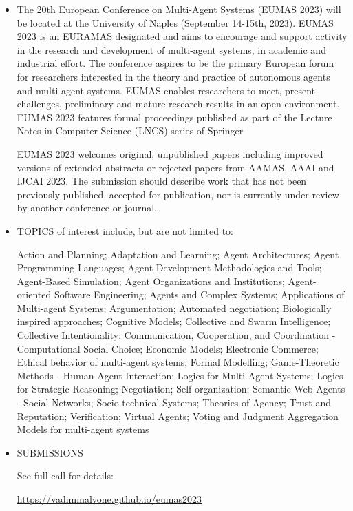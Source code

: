 \documentclass[prodmode,acmtecs]{acmsmall} %
\begin{document}
\begin{itemize}\item  The 20th European Conference on Multi-Agent Systems (EUMAS 2023) will be located at the University of Naples (September 14-15th, 2023). EUMAS 2023 is an EURAMAS designated and aims to encourage and support activity in the research and development of multi-agent systems, in academic and industrial effort. The conference aspires to be the primary European forum for researchers interested in the theory and practice of autonomous agents and multi-agent systems. EUMAS enables researchers to meet, present challenges, preliminary and mature research results in an open environment. EUMAS 2023 features formal proceedings published as part of the Lecture Notes in Computer Science (LNCS) series of Springer 
 
  EUMAS 2023 welcomes original, unpublished papers including improved versions of extended abstracts or rejected papers from AAMAS, AAAI and IJCAI 2023. The submission should describe work that has not been previously published, accepted for publication, nor is currently under review by another conference or journal. 
 
\item  TOPICS of interest include, but are not limited to: 
 
  Action and Planning; Adaptation and Learning; Agent Architectures; Agent Programming Languages; Agent Development Methodologies and Tools; Agent-Based Simulation; Agent Organizations and Institutions; Agent-oriented Software Engineering; Agents and Complex Systems; Applications of Multi-agent Systems; Argumentation; Automated negotiation; Biologically inspired approaches; Cognitive Models; Collective and Swarm Intelligence; Collective Intentionality; Communication, Cooperation, and Coordination - Computational Social Choice; Economic Models; Electronic Commerce; Ethical behavior of multi-agent systems; Formal Modelling; Game-Theoretic Methods - Human-Agent Interaction; Logics for Multi-Agent Systems; Logics for Strategic Reasoning; Negotiation; Self-organization; Semantic Web Agents - Social Networks; Socio-technical Systems; Theories of Agency; Trust and Reputation; Verification; Virtual Agents; Voting and Judgment Aggregation Models for multi-agent systems 
 
\item  SUBMISSIONS 
 
   See full call for details: 
 
   \href{https://vadimmalvone.github.io/eumas2023}{https://vadimmalvone.github.io/eumas2023} 
 

\end{itemize}
\end{document}
